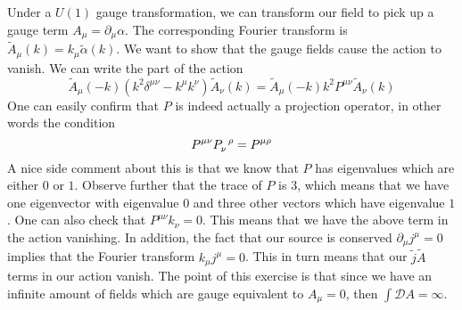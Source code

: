 \documentclass[11pt, oneside]{article}   	%
\theoremstyle{slanted}
\begin{document}
Under a $ U \left(  1  \right)  $
gauge transformation, we can transform 
our field to pick up a gauge term $ A _ \mu  = \partial  _ \mu \alpha $. 
The corresponding Fourier transform
is $ \tilde{ A } _ \mu \left( k  \right)   = k _\mu \tilde{ \alpha } \left( k  \right)    $. 
We want to show that the gauge fields cause the 
action to vanish. We can 
write the part of the action 
\[
\tilde{ A } _ \mu \left( -k  \right)  \left( k ^ 2 
\delta ^{ \mu \nu } - k ^ \mu k ^ \nu  \right)  \tilde{ A}_ \nu \left( k  \right)
= \tilde{ A } _ \mu \left(  -k  \right)   k ^2 P ^{ \mu \nu } \tilde{ A } _ \nu \left( k  \right)    
\] One can easily confirm that $ P $ is indeed 
actually a projection operator, in other words 
the condition 
\[
P ^{ \mu \nu } P \indices{_ \nu ^ \rho  }   = P ^{ \mu \rho } 
\] A nice side comment about this 
is that we know that $ P $ has eigenvalues which 
are either $ 0 $ or $ 1 $. Observe further 
that the trace of  $ P $ is $ 3 $, which means 
that we have one eigenvector with eigenvalue $ 0 $ 
and three other vectors which have eigenvalue $ 1 $. 
One can also 
check that $ P ^{ \mu \nu } k _ \nu  = 0 $. 
This means that we have the above term 
in the action vanishing. In addition, the fact that 
our source is conserved $ \partial  _ \mu j ^ \mu  = 0 $
implies that the Fourier transform 
$ k _ \mu j ^ \mu  =0 $. This in turn means 
that our $ \tilde{ j } \tilde{ A }   $ terms 
in our action vanish. 
The point of this exercise is that 
since we have an infinite amount of fields 
which are gauge equivalent to $ A _ \mu  = 0 $, 
then $ \int \mathcal{ D } A  =  \infty $. 
\end{document}
